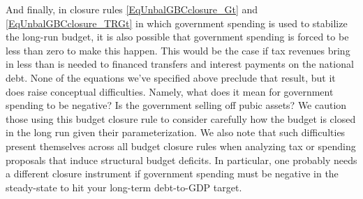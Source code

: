   And finally, in closure rules \eqref{EqUnbalGBCclosure_Gt} and \eqref{EqUnbalGBCclosure_TRGt} in which government spending is used to stabilize the long-run budget, it is also possible that government spending is forced to be less than zero to make this happen. This would be the case if tax revenues bring in less than is needed to financed transfers and interest payments on the national debt. None of the equations we've specified above preclude that result, but it does raise conceptual difficulties. Namely, what does it mean for government spending to be negative? Is the government selling off pubic assets? We caution those using this budget closure rule to consider carefully how the budget is closed in the long run given their parameterization. We also note that such difficulties present themselves across all budget closure rules when analyzing tax or spending proposals that induce structural budget deficits. In particular, one probably needs a different closure instrument if government spending must be negative in the steady-state to hit your long-term debt-to-GDP target.
